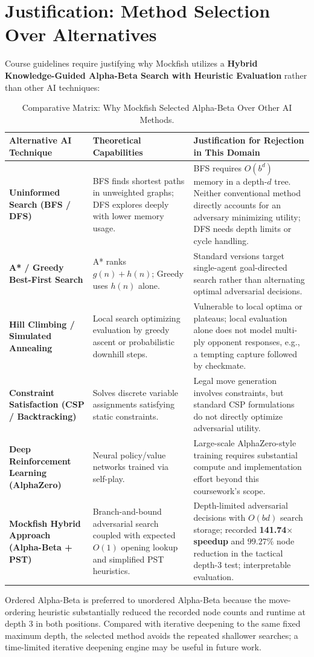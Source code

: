 \documentclass[11pt,a4paper]{article}
\begin{document}
\section{Justification: Method Selection Over Alternatives}
Course guidelines require justifying why Mockfish utilizes a \textbf{Hybrid Knowledge-Guided Alpha-Beta Search with Heuristic Evaluation} rather than other AI techniques:
\begin{table}[H]
\centering
\caption{Comparative Matrix: Why Mockfish Selected Alpha-Beta Over Other AI Methods.}
\label{tab:algorithm_justification}
\small
\renewcommand{\arraystretch}{1.2}
\begin{tabularx}{\textwidth}{@{} L{2.8cm} Y Y @{}}
\toprule
\textbf{Alternative AI Technique} & \textbf{Theoretical Capabilities} & \textbf{Justification for Rejection in This Domain} \\
\midrule
\textbf{Uninformed Search (BFS / DFS)} & BFS finds shortest paths in unweighted graphs; DFS explores deeply with lower memory usage. & BFS requires $O(b^d)$ memory in a depth-$d$ tree. Neither conventional method directly accounts for an adversary minimizing utility; DFS needs depth limits or cycle handling. \\
\textbf{A* / Greedy Best-First Search} & A* ranks $g(n)+h(n)$; Greedy uses $h(n)$ alone. & Standard versions target single-agent goal-directed search rather than alternating optimal adversarial decisions. \\
\textbf{Hill Climbing / Simulated Annealing} & Local search optimizing evaluation by greedy ascent or probabilistic downhill steps. & Vulnerable to local optima or plateaus; local evaluation alone does not model multi-ply opponent responses, e.g., a tempting capture followed by checkmate. \\
\textbf{Constraint Satisfaction (CSP / Backtracking)} & Solves discrete variable assignments satisfying static constraints. & Legal move generation involves constraints, but standard CSP formulations do not directly optimize adversarial utility. \\
\textbf{Deep Reinforcement Learning (AlphaZero)} & Neural policy/value networks trained via self-play. & Large-scale AlphaZero-style training requires substantial compute and implementation effort beyond this coursework's scope. \\
\midrule
\textbf{Mockfish Hybrid Approach (Alpha-Beta + PST)} & Branch-and-bound adversarial search coupled with expected $O(1)$ opening lookup and simplified PST heuristics. & Depth-limited adversarial decisions with $O(bd)$ search storage; recorded \textbf{141.74$\times$ speedup} and $99.27\%$ node reduction in the tactical depth-3 test; interpretable evaluation. \\
\bottomrule
\end{tabularx}
\end{table}
Ordered Alpha-Beta is preferred to unordered Alpha-Beta because the move-ordering heuristic substantially reduced the recorded node counts and runtime at depth 3 in both positions. Compared with iterative deepening to the same fixed maximum depth, the selected method avoids the repeated shallower searches; a time-limited iterative deepening engine may be useful in future work.
\end{document}

